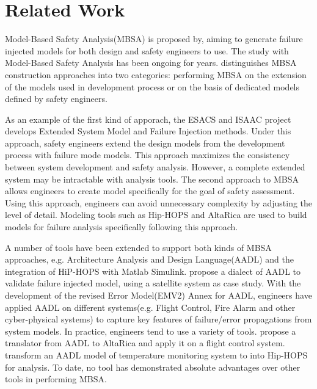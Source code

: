 \section{Related Work}
Model-Based Safety Analysis(MBSA) is proposed by\cite{mbsa05}, aiming to generate failure injected models for both design and safety engineers to use. The study with Model-Based Safety Analysis has been ongoing for years. \cite{mbsa11} distinguishes MBSA construction approaches into two categories: performing MBSA on the extension of the models used in development process or on the basis of dedicated models defined by safety engineers.

As an example of the first kind of apporach, the ESACS and ISAAC project develops Extended System Model and Failure Injection methods\cite{erts06}\cite{esrel03}. Under this approach, safety engineers extend the design models from the development process with failure mode models. This approach maximizes the consistency between system development and safety analysis. However, a complete extended system may be intractable with analysis tools. The second approach to MBSA allows engineers to create model specifically for the goal of safety assessment. Using this approach, engineers can avoid unnecessary complexity by adjusting the level of detail. Modeling tools such as Hip-HOPS and AltaRica are used to build models for failure analysis specifically following this approach. 



A number of tools have been extended to support both kinds of MBSA approaches, e.g. Architecture Analysis and Design Language(AADL)\cite{cmu07}\cite{sae11} and the integration of HiP-HOPS with Matlab Simulink\cite{dsn01}. \cite{aadl13} propose a dialect of AADL to validate failure injected model, using a satellite system as case study. With the development of the revised Error Model(EMV2) Annex\cite{aadlemv2} for AADL, engineers have applied AADL on different systems(e.g. Flight Control\cite{field1}, Fire Alarm\cite{field2} and other cyber-physical systems\cite{field3}) to capture key features of failure/error propagations from system models. In practice, engineers tend to use a variety of tools. \cite{aadl_altarica} propose a translator from AADL to AltaRica and apply it on a flight control system.\cite{aadl_hiphop} transform an AADL model of temperature monitoring system to into Hip-HOPS for analysis. To date, no tool has demonstrated absolute advantages over other tools in performing MBSA.
